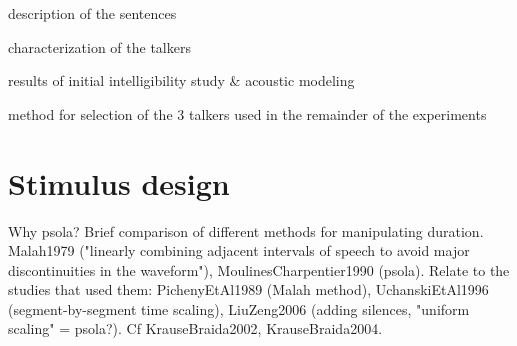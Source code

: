 \begin{itm}
	\item{description of the sentences}
	\item{characterization of the talkers}
	\item{results of initial intelligibility study \& acoustic modeling}
	\item{method for selection of the 3 talkers used in the remainder of the experiments}
\end{itm}


\section{Stimulus design\label{sec:StimDesign}}
Why \ac{psola}?  Brief comparison of different methods for manipulating duration.  Malah1979 ("linearly combining adjacent intervals of speech to avoid major discontinuities in the waveform"), MoulinesCharpentier1990 (\ac{psola}).  Relate to the studies that used them: PichenyEtAl1989 (Malah method), UchanskiEtAl1996 (segment-by-segment time scaling), LiuZeng2006 (adding silences, "uniform scaling" = \ac{psola}?).  Cf KrauseBraida2002, KrauseBraida2004.


